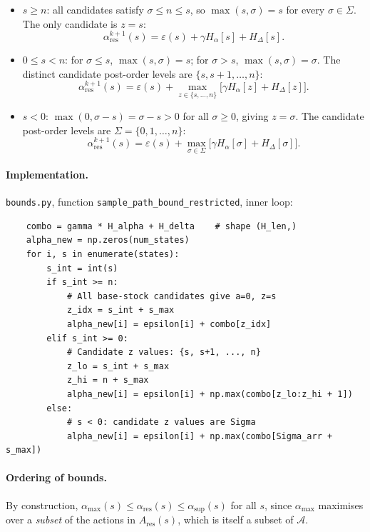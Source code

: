 \documentclass[11pt]{article}
\newcommand{\alphares}{\alpha_{\mathrm{res}}}
\begin{document}
\begin{itemize}
  \item \textbf{$s \ge n$}: all candidates satisfy $\sigma \le n \le s$, so
        $\max(s, \sigma) = s$ for every $\sigma \in \Sigma$.  The only
        candidate is $z = s$:
        \[
          \alphares^{k+1}(s) = \varepsilon(s) + \gamma H_\alpha[s] + H_\Delta[s].
        \]
  \item \textbf{$0 \le s < n$}: for $\sigma \le s$, $\max(s, \sigma) = s$;
        for $\sigma > s$, $\max(s, \sigma) = \sigma$.  The distinct candidate
        post-order levels are $\{s, s+1, \ldots, n\}$:
        \[
          \alphares^{k+1}(s) = \varepsilon(s) + \max_{z \in \{s, \ldots, n\}}
          \bigl[\gamma H_\alpha[z] + H_\Delta[z]\bigr].
        \]
  \item \textbf{$s < 0$}: $\max(0, \sigma - s) = \sigma - s > 0$ for all
        $\sigma \ge 0$, giving $z = \sigma$.  The candidate post-order levels
        are $\Sigma = \{0, 1, \ldots, n\}$:
        \[
          \alphares^{k+1}(s) = \varepsilon(s) + \max_{\sigma \in \Sigma}
          \bigl[\gamma H_\alpha[\sigma] + H_\Delta[\sigma]\bigr].
        \]
\end{itemize}

\paragraph{Implementation.}
\texttt{bounds.py}, function \texttt{sample\_path\_bound\_restricted},
inner loop:
\begin{verbatim}
    combo = gamma * H_alpha + H_delta    # shape (H_len,)
    alpha_new = np.zeros(num_states)
    for i, s in enumerate(states):
        s_int = int(s)
        if s_int >= n:
            # All base-stock candidates give a=0, z=s
            z_idx = s_int + s_max
            alpha_new[i] = epsilon[i] + combo[z_idx]
        elif s_int >= 0:
            # Candidate z values: {s, s+1, ..., n}
            z_lo = s_int + s_max
            z_hi = n + s_max
            alpha_new[i] = epsilon[i] + np.max(combo[z_lo:z_hi + 1])
        else:
            # s < 0: candidate z values are Sigma
            alpha_new[i] = epsilon[i] + np.max(combo[Sigma_arr + s_max])
\end{verbatim}

\paragraph{Ordering of bounds.}

By construction, $\alpha_{\max}(s) \le \alphares(s) \le \alpha_{\sup}(s)$ for all $s$, since
$\alpha_{\max}$ maximises over a \emph{subset} of the actions in $A_{\mathrm{res}}(s)$,
which is itself a subset of $\mathcal{A}$.
\end{document}

